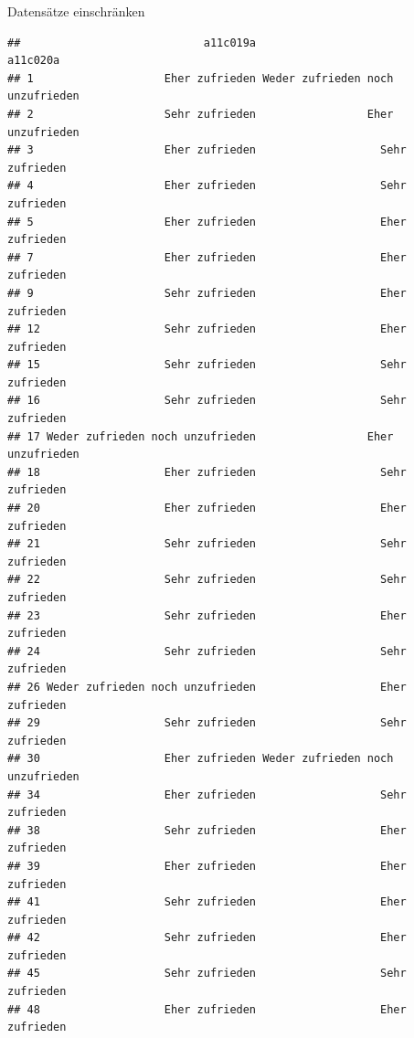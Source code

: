 \documentclass[ignorenonframetext,]{beamer}
\newenvironment{Shaded}{}{}
\newcommand{\StringTok}[1]{\textcolor[rgb]{0.25,0.44,0.63}{{#1}}}
\newcommand{\NormalTok}[1]{{#1}}
\begin{document}
\begin{frame}[fragile]{Datensätze einschränken}

\begin{Shaded}
\end{Shaded}

\begin{verbatim}
##                            a11c019a                         a11c020a
## 1                    Eher zufrieden Weder zufrieden noch unzufrieden
## 2                    Sehr zufrieden                 Eher unzufrieden
## 3                    Eher zufrieden                   Sehr zufrieden
## 4                    Eher zufrieden                   Sehr zufrieden
## 5                    Eher zufrieden                   Eher zufrieden
## 7                    Eher zufrieden                   Eher zufrieden
## 9                    Sehr zufrieden                   Eher zufrieden
## 12                   Sehr zufrieden                   Eher zufrieden
## 15                   Sehr zufrieden                   Sehr zufrieden
## 16                   Sehr zufrieden                   Sehr zufrieden
## 17 Weder zufrieden noch unzufrieden                 Eher unzufrieden
## 18                   Eher zufrieden                   Sehr zufrieden
## 20                   Eher zufrieden                   Eher zufrieden
## 21                   Sehr zufrieden                   Sehr zufrieden
## 22                   Sehr zufrieden                   Sehr zufrieden
## 23                   Sehr zufrieden                   Eher zufrieden
## 24                   Sehr zufrieden                   Sehr zufrieden
## 26 Weder zufrieden noch unzufrieden                   Eher zufrieden
## 29                   Sehr zufrieden                   Sehr zufrieden
## 30                   Eher zufrieden Weder zufrieden noch unzufrieden
## 34                   Eher zufrieden                   Sehr zufrieden
## 38                   Sehr zufrieden                   Eher zufrieden
## 39                   Eher zufrieden                   Eher zufrieden
## 41                   Sehr zufrieden                   Eher zufrieden
## 42                   Sehr zufrieden                   Eher zufrieden
## 45                   Sehr zufrieden                   Sehr zufrieden
## 48                   Eher zufrieden                   Eher zufrieden

\end{verbatim}
\end{frame}
\end{document}

